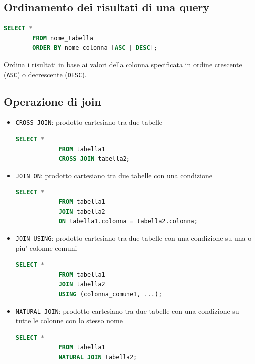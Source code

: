 \documentclass[12pt, a4paper]{report}
\begin{document}
    \subsection{Ordinamento dei risultati di una query}
    \begin{lstlisting}[language=SQL]
        SELECT *
        FROM nome_tabella
        ORDER BY nome_colonna [ASC | DESC];
    \end{lstlisting}
    Ordina i risultati in base ai valori della colonna specificata in ordine crescente (\texttt{ASC}) o decrescente (\texttt{DESC}).
    \subsection{Operazione di join}
    \begin{itemize}
        \item \texttt{CROSS JOIN}: prodotto cartesiano tra due tabelle \begin{lstlisting}[language=SQL]
            SELECT *
            FROM tabella1
            CROSS JOIN tabella2;
        \end{lstlisting}
        \item \texttt{JOIN ON}: prodotto cartesiano tra due tabelle con una condizione \begin{lstlisting}[language=SQL]
            SELECT *
            FROM tabella1
            JOIN tabella2
            ON tabella1.colonna = tabella2.colonna;
        \end{lstlisting}
        \item \texttt{JOIN USING}: prodotto cartesiano tra due tabelle con una condizione su una o piu' colonne comuni \begin{lstlisting}[language=SQL]
            SELECT *
            FROM tabella1
            JOIN tabella2
            USING (colonna_comune1, ...);
        \end{lstlisting}
        \item \texttt{NATURAL JOIN}: prodotto cartesiano tra due tabelle con una condizione su tutte le colonne con lo stesso nome \begin{lstlisting}[language=SQL]
            SELECT *
            FROM tabella1
            NATURAL JOIN tabella2;
        \end{lstlisting}
    \end{itemize}
\end{document}
